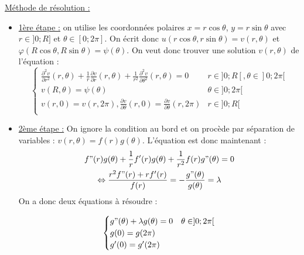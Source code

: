 \documentclass[../main.tex]{subfiles}
\begin{document}
\quad \underline{Méthode de résolution :}\\
\begin{itemize}
    \item \underline{1ère étape :} on utilise les coordonnées polaires $x=r\cos\theta$, $y=r\sin{\theta}$ avec $r\in ]0;R]$ et $\theta \in [0;2\pi]$. On écrit donc $u(r\cos{\theta}, r\sin{\theta}) = v(r,\theta)$ et $\varphi(R\cos{\theta}, R\sin{\theta}) = \psi(\theta)$. On veut donc trouver une solution $v(r,\theta)$ de l'équation : \begin{equation}
    \begin{cases}
        \frac{\partial^2 v}{\partial r^2}(r,\theta) + \frac{1}{r} \frac{\partial v}{\partial r}(r,\theta) + \frac{1}{r^2} \frac{\partial^2 v}{\partial \theta^2}(r,\theta) = 0 & r\in ]0;R[, \theta \in ]0;2\pi[\\
        v(R,\theta) = \psi(\theta) & \theta \in ]0;2\pi[\\
        v(r,0) = v(r,2\pi), \frac{\partial v}{\partial \theta} (r,0) = \frac{\partial v}{\partial \theta}(r,2\pi) & r \in ]0;R[\\
        \end{cases}
    \end{equation}
    \item \underline{2ème étape :} On ignore la condition au bord et on procède par séparation de variables : $v(r,\theta) = f(r) g(\theta)$. L'équation est donc maintenant : \begin{equation}\begin{gathered}
        f"(r)g(\theta) + \frac{1}{r}f'(r) g(\theta) + \frac{1}{r^2}f(r) g"(\theta) = 0\\
        \Leftrightarrow \frac{r^2 f"(r) + r f'(r)}{f(r)} = -\frac{g"(\theta)}{g(\theta)} = \lambda
        \end{gathered}
    \end{equation}
    On a donc deux équations à résoudre : \\
    \begin{minipage}{.5\textwidth}
        \begin{equation}
            \begin{cases}
                g"(\theta) + \lambda g(\theta) = 0 & \theta \in ]0;2\pi[\\
                g(0) = g(2\pi)\\
                g'(0) = g'(2\pi)\\
            \end{cases}
        \end{equation}

\end{minipage}
\end{itemize}
\end{document}
